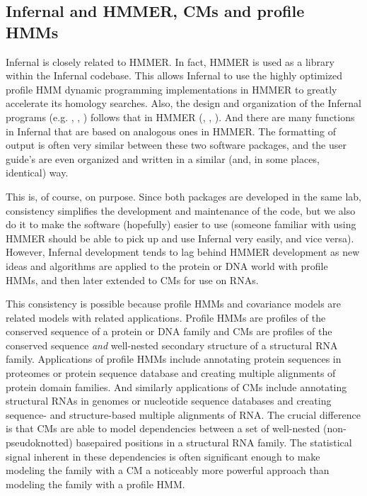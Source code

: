 \subsection{Infernal and HMMER, CMs and profile HMMs}

Infernal is closely related to HMMER. In fact, HMMER is used as a
library within the Infernal codebase. This allows Infernal to use the
highly optimized profile HMM dynamic programming implementations in
HMMER to greatly accelerate its homology searches. Also, the design
and organization of the Infernal programs (e.g. ,
, ) follows that in HMMER
(, , ). And there are
many functions in Infernal that are based on analogous ones in
HMMER. The formatting of output is often very similar between
these two software packages, and the user guide's are even organized
and written in a similar (and, in some places, identical) way. 

This is, of course, on purpose. Since both packages are developed in
the same lab, consistency simplifies the development and maintenance
of the code, but we also do it to make the software (hopefully) easier
to use (someone familiar with using HMMER should be able to pick up
and use Infernal very easily, and vice versa). However, Infernal
development tends to lag behind HMMER development as new ideas and
algorithms are applied to the protein or DNA world with profile HMMs,
and then later extended to CMs for use on RNAs.

This consistency is possible because profile HMMs and covariance
models are related models with related applications.  Profile HMMs are
profiles of the conserved sequence of a protein or DNA family and CMs
are profiles of the conserved sequence \emph{and} well-nested
secondary structure of a structural RNA family. Applications of
profile HMMs include annotating protein sequences in proteomes or
protein sequence database and creating multiple alignments of protein
domain families. And similarly applications of CMs include annotating
structural RNAs in genomes or nucleotide sequence databases and
creating sequence- and structure-based multiple alignments of RNA.
The crucial difference is that CMs are able to model dependencies
between a set of well-nested (non-pseudoknotted) basepaired positions
in a structural RNA family. The statistical signal inherent in these
dependencies is often significant enough to make modeling the family
with a CM a noticeably more powerful approach than modeling the family
with a profile HMM.

